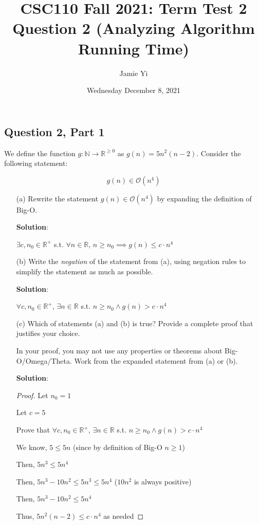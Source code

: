 \documentclass{article}
\title{CSC110 Fall 2021: Term Test 2\\
Question 2 (Analyzing Algorithm Running Time)}
\author{Jamie Yi}
\date{Wednesday December 8, 2021}
\newcommand{\N}{\mathbb{N}}
\newcommand{\R}{\mathbb{R}}
\newcommand{\cO}{\mathcal{O}}
\begin{document}
\maketitle

\subsection*{Question 2, Part 1}

\noindent
We define the function $g: \N \to \R^{\geq 0}$ as $g(n) = 5n^2(n-2)$.
Consider the following statement:

\[
g(n) \in \cO(n^4)
\]

\begin{enumerate}

\item[(a)]
Rewrite the statement $g(n) \in \cO(n^4)$ by expanding the definition of Big-O.

\bigskip

\textbf{Solution}:

$\exists c, n_0 \in \mathbb{R}^+ $ s.t. $\forall n \in \mathbb{R}$, $n \geq n_0 \implies g(n) \leq c \cdot n^4$

\item[(b)]
Write the \emph{negation} of the statement from (a), using negation rules to simplify the statement as much as possible.

\bigskip

\textbf{Solution}:

$\forall c, n_0 \in \mathbb{R}^+ $, $\exists n \in \mathbb{R}$ s.t. $n \geq n_0 \wedge g(n) > c \cdot n^4$

\item[(c)]
Which of statements (a) and (b) is true? Provide a complete proof that justifies your choice.

In your proof, you may not use any properties or theorems about Big-O/Omega/Theta. Work from the expanded statement from (a) or (b).

\bigskip

\textbf{Solution}:

\begin{proof}
Let $n_0 = 1$

Let $c = 5$

Prove that $\forall c, n_0 \in \mathbb{R}^+ $, $\exists n \in \mathbb{R}$ s.t. $n \geq n_0 \wedge g(n) > c \cdot n^4$

We know, $5 \leq 5n$ (since by definition of Big-O $n \geq 1$)

Then, $5n^3 \leq 5n^4$

Then, $5n^3 - 10n^2 \leq 5n^3 \leq 5n^4$ ($10n^2$ is always positive)

Then, $5n^3 - 10n^2 \leq 5n^4$

Thus, $5n^2(n-2) \leq c \cdot n^4$ as needed

\end{proof}

\end{enumerate}
\end{document}

